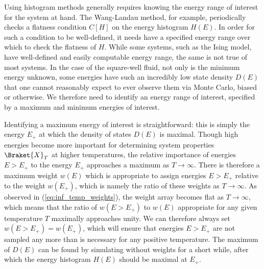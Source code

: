 \documentclass[11pt]{article}
\newcommand{\bk}{\Braket} %
\newcommand{\p}[1]{\left(#1\right)} %
\renewcommand{\sp}[1]{\left[#1\right]} %
\begin{document}
Using histogram methods generally requires knowing the energy range of
interest for the system at hand. The Wang-Landau method, for example,
periodically checks a flatness condition $C\sp{H}$ on the energy
histogram $H\p{E}$. In order for such a condition to be well-defined,
it needs have a specified energy range over which to check the
flatness of $H$. While some systems, such as the Ising model, have
well-defined and easily computable energy range, the same is not true
of most systems. In the case of the square-well fluid, not only is the
minimum energy unknown, some energies have such an incredibly low
state density $D\p{E}$ that one cannot reasonably expect to ever
observe them via Monte Carlo, biased or otherwise. We therefore need
to identify an energy range of interest, specified by a maximum and
minimum energies of interest.

Identifying a maximum energy of interest is straightforward: this is
simply the energy $E_+$ at which the density of states $D\p{E}$ is
maximal. Though high energies become more important for determining
system properties $\bk{X}_T$ at higher temperatures, the relative
importance of energies $E>E_+$ to the energy $E_+$ approaches a
maximum as $T\to\infty$. There is therefore a maximum weight $w\p{E}$
which is appropriate to assign energies $E>E_+$ relative to the weight
$w\p{E_+}$, which is namely the ratio of these weights as
$T\to\infty$. As observed in (\ref{eq:inf_temp_weights}), the weight
array becomes flat as $T\to\infty$, which means that the ratio of
$w\p{E>E_+}$ to $w\p{E}$ appropriate for any given temperature $T$
maximally approaches unity. We can therefore always set
$w\p{E>E_+}=w\p{E_+}$, which will ensure that energies $E>E_+$ are not
sampled any more than is necessary for any positive temperature. The
maximum of $D\p{E}$ can be found by simulating without weights for a
short while, after which the energy histogram $H\p{E}$ should be
maximal at $E_+$.
\end{document}
